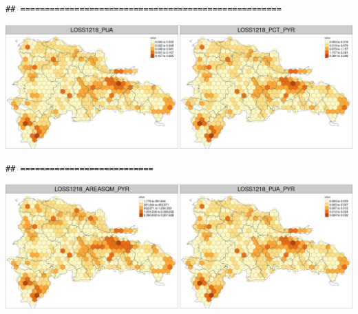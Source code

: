 \documentclass[10pt,landscape,a3paper]{article}
\begin{document}
\begin{verbatim}
## =====================================================
\end{verbatim}

\begin{center}\includegraphics{img/zonal-long-term-grid-11} \end{center}

\begin{verbatim}
## ===========================
\end{verbatim}

\begin{center}\includegraphics{img/zonal-long-term-grid-12} \end{center}
\end{document}
